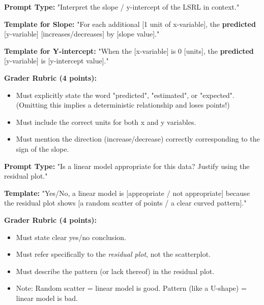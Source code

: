 \begin{frqrubricbox}
\textbf{Prompt Type:} "Interpret the slope / y-intercept of the LSRL in context."

\textbf{Template for Slope:}
"For each additional [1 unit of x-variable], the \textbf{predicted} [y-variable] [increases/decreases] by [slope value]."

\textbf{Template for Y-intercept:}
"When the [x-variable] is 0 [units], the \textbf{predicted} [y-variable] is [y-intercept value]."

\textbf{Grader Rubric (4 points):}
\begin{itemize}
    \item Must explicitly state the word "predicted", "estimated", or "expected". (Omitting this implies a deterministic relationship and loses points!)
    \item Must include the correct units for both x and y variables.
    \item Must mention the direction (increase/decrease) correctly corresponding to the sign of the slope.
\end{itemize}
\end{frqrubricbox}

\begin{frqrubricbox}
\textbf{Prompt Type:} "Is a linear model appropriate for this data? Justify using the residual plot."

\textbf{Template:}
"Yes/No, a linear model is [appropriate / not appropriate] because the residual plot shows [a random scatter of points / a clear curved pattern]."

\textbf{Grader Rubric (4 points):}
\begin{itemize}
    \item Must state clear yes/no conclusion.
    \item Must refer specifically to the \textit{residual plot}, not the scatterplot.
    \item Must describe the pattern (or lack thereof) in the residual plot.
    \item Note: Random scatter = linear model is good. Pattern (like a U-shape) = linear model is bad.
\end{itemize}
\end{frqrubricbox}


